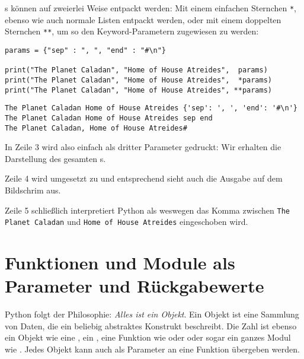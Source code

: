 s können auf zweierlei Weise entpackt werden: Mit einem einfachen Sternchen \texttt{*}, ebenso wie auch normale Listen entpackt werden, oder mit einem doppelten Sternchen \texttt{**}, um so den Keyword-Parametern zugewiesen zu werden:

\begin{codebox}
\begin{verbatim}
params = {"sep" : ", ", "end" : "#\n"}

print("The Planet Caladan", "Home of House Atreides",  params)
print("The Planet Caladan", "Home of House Atreides",  *params)
print("The Planet Caladan", "Home of House Atreides", **params)
\end{verbatim}
\end{codebox}
\begin{cmdbox}
\begin{verbatim}
The Planet Caladan Home of House Atreides {'sep': ', ', 'end': '#\n'}
The Planet Caladan Home of House Atreides sep end
The Planet Caladan, Home of House Atreides#
\end{verbatim}
\end{cmdbox}

In Zeile 3 wird also  einfach als dritter Parameter gedruckt: Wir erhalten die Darstellung des gesamten s.

Zeile 4 wird umgesetzt zu 
und entsprechend sieht auch die Ausgabe auf dem Bildschrim aus.

Zeile 5 schließlich interpretiert Python als
weswegen das Komma zwischen \texttt{The Planet Caladan} und \texttt{Home of House Atreides} eingeschoben wird.

\section{Funktionen und Module als Parameter und Rückgabewerte}
\label{sec:FuncsAsObjects}
Python folgt der Philosophie: \emph{Alles ist ein Objekt}. Ein Objekt ist eine Sammlung von Daten, die ein beliebig abstraktes Konstrukt beschreibt. Die Zahl  ist ebenso ein Objekt wie eine , ein , eine Funktion wie  oder  oder sogar ein ganzes Modul wie . Jedes Objekt kann auch als Parameter an eine Funktion übergeben werden.

